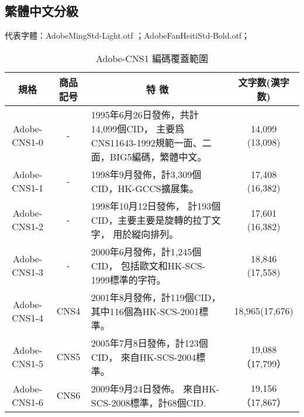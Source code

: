 \begin{appendix}
\begin{table}[h]
\begin{tabular}{|c|c|p{8cm}|c|}
\hline %
\end{tabular}

\end{table}


\subsection{繁體中文分級}
{\gtfamily 代表字體：AdobeMingStd-Light.otf ；AdobeFanHeitiStd-Bold.otf；}
\begin{table}[h]
\caption{\fontsize{12pt}{15pt}\selectfont Adobe-CNS1 編碼覆蓋範圍} %
\centering %
\begin{tabular}{|c|c|p{8cm}|c|}%
\hline  %

規格 & 商品記号	& \multicolumn{1}{|c|}{特 徴} & 文字数(漢字数) \\

\hline  %
Adobe-CNS1-0 &	-	 & 1995年6月26日發佈，共計14,099個CID，
主要爲CNS11643-1992規範一面、二面，BIG5編碼，繁體中文。
& 14,099 (13,098) \\
\hline
Adobe-CNS1-1	& - &	1998年9月發佈，計3,309個CID，HK-GCCS擴展集。
& 	17,408 (16,382) \\
\hline
Adobe-CNS1-2	& - &  1998年10月12日發佈，
計193個CID，主要主要是旋轉的拉丁文字，
用於縱向排列。 & 17,601 (16,382) \\
\hline

Adobe-CNS1-3	& -	&   2000年6月發佈，計1,245個CID，
包括歐文和HK-SCS-1999標準的字符。
&  18,846 (17,558) \\

\hline
Adobe-CNS1-4	& CNS4 & 2001年8月發佈，計119個CID，
其中116個為HK-SCS-2001標準。
& 18,965(17,676) \\
\hline
Adobe-CNS1-5	& CNS5 & 2005年7月8日發佈，計123個CID，
來自HK-SCS-2004標準。 & 19,088（17,799） \\
\hline
Adobe-CNS1-6	& CNS6 & 2009年9月24日發佈。
來自HK-SCS-2008標準，計68個CID. & 19,156（17,867） \\
\hline %
\end{tabular}

\end{table}

\end{appendix}